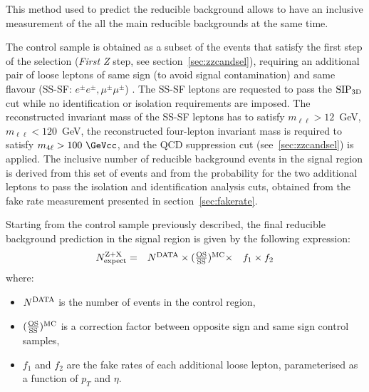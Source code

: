 
This method used to predict the reducible background allows to
have an inclusive measurement of the all the main reducible
backgrounds at the same time.

The control sample is obtained as a subset of the events that satisfy
the first step of the selection ({\it First Z} step, see
section~\ref{sec:zzcandsel}), requiring an additional pair of 
loose leptons of same sign (to avoid signal contamination) and same
flavour (SS-SF: $e^{\pm}e^{\pm}, \mu^{\pm}\mu^{\pm}$) .  The SS-SF
leptons are requested to pass the ${\rm SIP_{3D}}$ cut while no
identification or isolation requirements are imposed.  The
reconstructed invariant mass of the SS-SF leptons has to satisfy 
$m_{ \ell \ell} > 12$~GeV, $m_{ \ell \ell} < 120$~GeV,
the reconstructed four-lepton
invariant mass is required to satisfy $m_{4\ell} > 100~\GeVcc$,
and the QCD suppression cut (see~\ref{sec:zzcandsel}) is applied.
The inclusive number of reducible background events in the
signal region is derived from this set of events and from the probability for the
two additional leptons to pass the isolation and identification
analysis cuts, obtained from the fake rate measurement presented in section~\ref{sec:fakerate}.

Starting from the control sample previously described, the final
reducible background prediction in the signal region is given by the
following expression:
\begin{equation} 
\label{eq:FakeRateAA}
\begin{array}{cccc}
N^{\rm Z+X}_{\rm expect}  = & N^{\rm DATA}  \times   \rm{(\frac {OS}{SS})^{MC}}   \times &  
 f_1 \times f_2 
\end{array} 
\end{equation} 
where:
%
\begin{itemize}
\item $N^{\rm DATA}$ is the number of events in the control region,
\item $\rm{(\frac {OS}{SS})^{MC}}$ is a correction factor between opposite sign and same sign control samples,
\item $f_1$ and $f_2$ are the fake rates of each additional loose lepton, parameterised as a
   function of $p_T$ and $\eta$.
\end{itemize}


